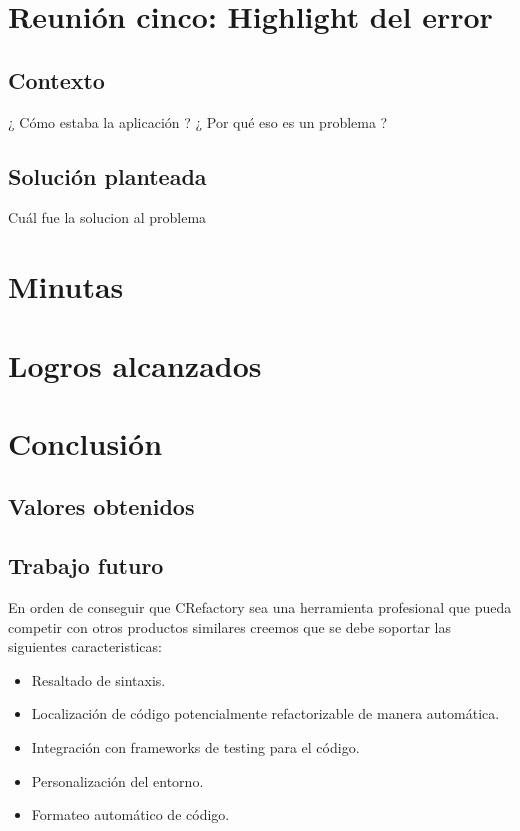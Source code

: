 \documentclass[a4paper,oneside,10pt]{article}
\begin{document}
\section{Reuni\'on cinco: Highlight del error}

\subsection{Contexto}
¿ C\'omo estaba la aplicaci\'on ? ¿ Por qu\'e eso es un problema ?

\subsection{Soluci\'on planteada}
Cu\'al fue la solucion al problema

\section{Minutas}

\section{Logros alcanzados}

\section{Conclusi\'on}

\subsection{Valores obtenidos}
\subsection{Trabajo futuro}
En orden de conseguir que CRefactory sea una herramienta profesional que pueda competir con otros productos similares creemos que se debe soportar las siguientes caracteristicas:
\begin{itemize}
	\item Resaltado de sintaxis.
	\item Localizaci\'on de c\'odigo potencialmente refactorizable de manera autom\'atica.
	\item Integraci\'on con frameworks de testing para el c\'odigo.
	\item Personalizaci\'on del entorno.
	\item Formateo autom\'atico de c\'odigo.
\end{itemize}
\end{document}
